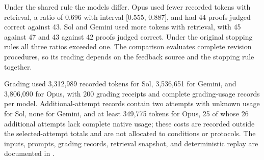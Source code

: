 \begin{table}[ht]
\centering\small
\caption{Proof development outcomes on 50 tasks per model, reported as BugBank / Plain. Correctness is judged by model graders using the recorded rubric. Recorded total tokens are uncached input, cached input, and output (with reported reasoning counted once within output) for the selected completed solver attempts, including auxiliary calls; output tokens also include auxiliary calls. Grading, rejected attempts, and later checks are accounted for separately. Total-token ratios divide the BugBank condition by Plain, with 95\% intervals from 2,000 paired bootstrap resamples of tasks.}
\label{tab:proof50-results}
\end{table}

Under the shared rule the models differ. Opus used fewer recorded tokens with retrieval, a ratio of 0.696 with interval [0.555, 0.887], and had 44 proofs judged correct against 43. Sol and Gemini used more tokens with retrieval, with 45 against 47 and 43 against 42 proofs judged correct. Under the original stopping rules all three ratios exceeded one. The comparison evaluates complete revision procedures, so its reading depends on the feedback source and the stopping rule together.

Grading used 3,312,989 recorded tokens for Sol, 3,536,651 for Gemini, and 3,806,090 for Opus, with 200 grading receipts and complete grading-usage records per model. Additional-attempt records contain two attempts with unknown usage for Sol, none for Gemini, and at least 349,775 tokens for Opus, 25 of whose 26 additional attempts lack complete native usage; these costs are recorded outside the selected-attempt totals and are not allocated to conditions or protocols. The inputs, prompts, grading records, retrieval snapshot, and deterministic replay are documented in .

